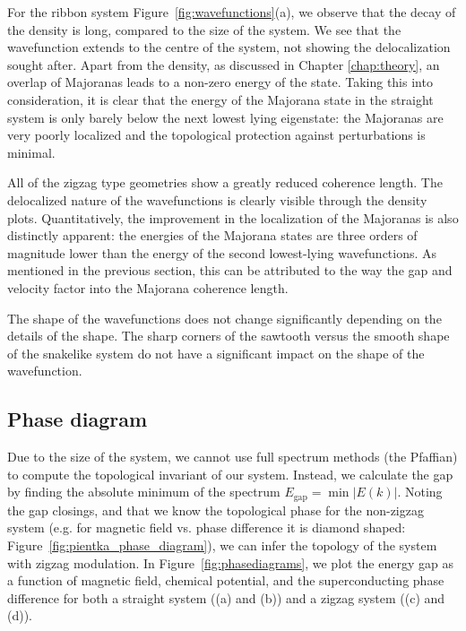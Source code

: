 			For the ribbon system Figure~\ref{fig:wavefunctions}(a), we observe that the decay of the density is long, compared to the size of the system.
			We see that the wavefunction extends to the centre of the system, not showing the delocalization sought after.
			Apart from the density, as discussed in Chapter \ref{chap:theory}, an overlap of Majoranas leads to a non-zero energy of the state.
			Taking this into consideration, it is clear that the energy of the Majorana state in the straight system is only barely below the next lowest lying eigenstate: the Majoranas are very poorly localized and the topological protection against perturbations is minimal.

			All of the zigzag type geometries show a greatly reduced coherence length.
			The delocalized nature of the wavefunctions is clearly visible through the density plots.
			Quantitatively, the improvement in the localization of the Majoranas is also distinctly apparent: the energies of the Majorana states are three orders of magnitude lower than the energy of the second lowest-lying wavefunctions.
			As mentioned in the previous section, this can be attributed to the way the gap and velocity factor into the Majorana coherence length.

			The shape of the wavefunctions does not change significantly depending on the details of the shape.
			The sharp corners of the sawtooth versus the smooth shape of the snakelike system do not have a significant impact on the shape of the wavefunction.


		\subsection{Phase diagram}

			Due to the size of the system, we cannot use full spectrum methods (the Pfaffian) to compute the topological invariant of our system.
			Instead, we calculate the gap by finding the absolute minimum of the spectrum $E_\textrm{gap}=\min{|E(k)|}$.
			Noting the gap closings, and that we know the topological phase for the non-zigzag system (e.g. for magnetic field vs. phase difference it is diamond shaped: Figure~\ref{fig:pientka_phase_diagram}), we can infer the topology of the system with zigzag modulation.
			In Figure~\ref{fig:phasediagrams}, we plot the energy gap as a function of magnetic field, chemical potential, and the superconducting phase difference for both a straight system ((a) and (b)) and a zigzag system ((c) and (d)).

